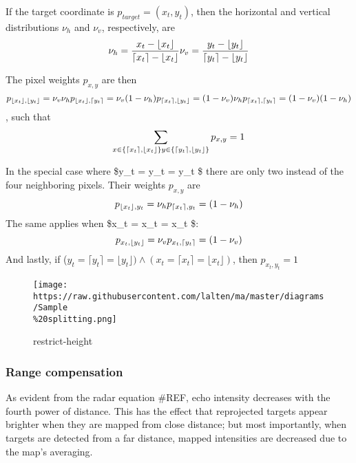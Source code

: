 If the target coordinate is \(p_{target}=(x_t, y_t)\), then the
horizontal and vertical distributions \(\nu_h\) and \(\nu_v\),
respectively, are \[
\nu_h = \frac{x_t - \lfloor x_t \rfloor}{\lceil x_t \rceil - \lfloor x_t \rfloor} \\
\nu_v = \frac{y_t - \lfloor y_t \rfloor}{\lceil y_t \rceil - \lfloor y_t \rfloor}
\]

The pixel weights \(p_{x,y}\) are then \[
p_{\lfloor x_t \rfloor, \lfloor y_t \rfloor} = \nu_v \nu_h\\
p_{\lfloor x_t \rfloor, \lceil y_t \rceil} = \nu_v (1 - \nu_h)\\
p_{\lceil x_t \rceil, \lfloor y_t \rfloor} =  (1 - \nu_v) \nu_h\\
p_{\lceil x_t \rceil, \lceil y_t \rceil} = (1 - \nu_v) (1 - \nu_h)
\] , such that \[
\sum\limits_{
x \in \{\lceil x_t \rceil, \lfloor x_t \rfloor\}\\
y \in \{\lceil y_t \rceil, \lfloor y_t \rfloor\}
} p_{x,y} = 1
\]

In the special case where \$y\_t = \lceil y\_t \rceil = \lfloor y\_t
\rfloor\$ there are only two instead of the four neighboring pixels.
Their weights \(p_{x,y}\) are \[
p_{\lfloor x_t \rfloor, y_t} = \nu_h\\
p_{\lceil x_t \rceil, y_t} = (1 - \nu_h)
\] The same applies when \$x\_t = \lceil x\_t \rceil = \lfloor x\_t
\rfloor\$: \[
p_{x_t, \lfloor y_t \rfloor} = \nu_v\\
p_{x_t, \lceil y_t \rceil} = (1 - \nu_v)
\] And lastly, if
(\(y_t = \lceil y_t \rceil = \lfloor y_t \rfloor ) \land (x_t = \lceil x_t \rceil = \lfloor x_t \rfloor )\),
then \(p_{x_t, y_t} = 1\)

\begin{figure}
\centering
\texttt{[image: https://raw.githubusercontent.com/lalten/ma/master/diagrams/Sample\\\%20splitting.png]}
\caption{restrict-height}
\end{figure}

\subsubsection{Range compensation}\label{range-compensation}

As evident from the radar equation \#REF, echo intensity decreases with
the fourth power of distance. This has the effect that reprojected
targets appear brighter when they are mapped from close distance; but
most importantly, when targets are detected from a far distance, mapped
intensities are decreased due to the map's averaging.

